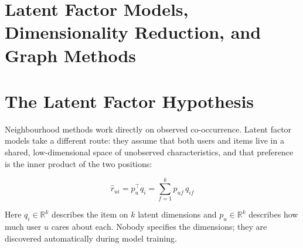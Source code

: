 \documentclass[12pt,a4paper]{article}
\begin{document}
\section*{Latent Factor Models, Dimensionality Reduction, and Graph Methods}

\section{The Latent Factor Hypothesis}

Neighbourhood methods work directly on observed co-occurrence. Latent factor models take a different route: they assume that both users and items live in a shared, low-dimensional space of unobserved characteristics, and that preference is the inner product of the two positions:

\begin{equation}
\hat{r}_{ui} = p_u^{\top} q_i = \sum_{f=1}^{k} p_{uf}\, q_{if}
\label{eq:m4-dot}
\end{equation}

Here $q_i \in \mathbb{R}^k$ describes the item on $k$ latent dimensions and $p_u \in \mathbb{R}^k$ describes how much user $u$ cares about each. Nobody specifies the dimensions; they are discovered automatically during model training.
\end{document}
